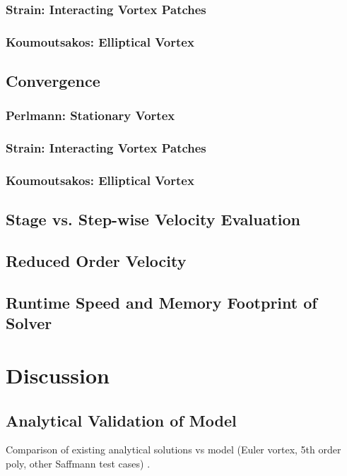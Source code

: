 \documentclass[letterpaper,12pt]{report}
\begin{document}
\subsection{Strain: Interacting Vortex Patches}

\subsection{Koumoutsakos: Elliptical Vortex}

\section{Convergence}
\subsection{Perlmann: Stationary Vortex}

\subsection{Strain: Interacting Vortex Patches}

\subsection{Koumoutsakos: Elliptical Vortex}


\section{Stage vs. Step-wise Velocity Evaluation}

\section{Reduced Order Velocity}

\section{Runtime Speed and Memory Footprint of Solver}
\chapter{Discussion}
\section{Analytical Validation of Model}
Comparison of existing analytical solutions vs model (Euler vortex, 5th order poly, other Saffmann test cases)
\newpage.
\newpage
\end{document}
